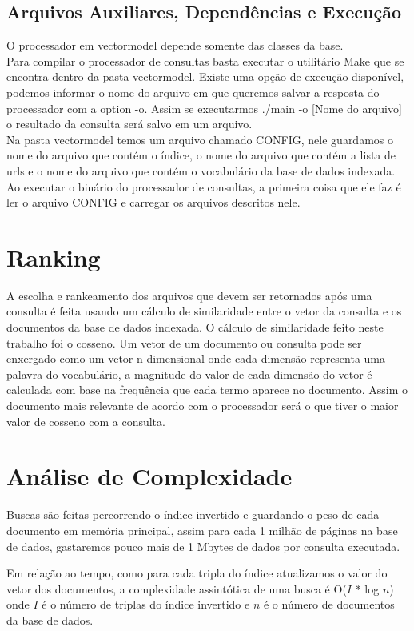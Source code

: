 \documentclass[11pt]{article}
\begin{document}
\subsection{Arquivos Auxiliares, Dependências e Execução}
O processador em vectormodel depende somente das classes da base.\\
Para compilar o processador de consultas basta executar o utilitário Make que se encontra dentro da pasta vectormodel. Existe uma opção de execução disponível, podemos informar o nome do arquivo em que queremos salvar a resposta do processador com a option -o. Assim se executarmos ./main -o [Nome do arquivo] o resultado da consulta será salvo em um arquivo.\\
Na pasta vectormodel temos um arquivo chamado CONFIG, nele guardamos o nome do arquivo que contém o índice, o nome do arquivo que contém a lista de urls e o nome do arquivo que contém o vocabulário da base de dados indexada. Ao executar o binário do processador de consultas, a primeira coisa que ele faz é ler o arquivo CONFIG e carregar os arquivos descritos nele.


\section {Ranking}
A escolha e rankeamento dos arquivos que devem ser retornados após uma consulta é feita usando um cálculo de similaridade entre o vetor da consulta e os documentos da base de dados indexada. O cálculo de similaridade feito neste trabalho foi o cosseno. Um vetor de um documento ou consulta pode ser enxergado como um vetor n-dimensional onde cada dimensão representa uma palavra do vocabulário, a magnitude do valor de cada dimensão do vetor é calculada com base na frequência que cada termo aparece no documento.
Assim o documento mais relevante de acordo com o processador será o que tiver o maior valor de cosseno com a consulta.


\section{Análise de Complexidade}
Buscas são feitas percorrendo o índice invertido e guardando o peso de cada documento em memória principal, assim para cada 1 milhão de páginas na base de dados, gastaremos pouco mais de 1 Mbytes de dados por consulta executada.

Em relação ao tempo, como para cada tripla do índice atualizamos o valor do vetor dos documentos, a complexidade assintótica de uma busca é O($I$ * log $n$) onde $I$ é o número de triplas do índice invertido e $n$ é o número de documentos da base de dados.
\end{document}
